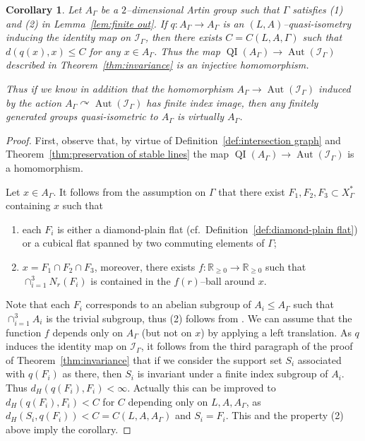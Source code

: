 \documentclass[11pt]{amsart}
\newcommand{\QI}{\operatorname{QI}}
\newcommand{\Aut}{\operatorname{Aut}}
\newcommand {\I}{\mathcal I}
\newtheorem{corollary}[theorem]{Corollary}
\theoremstyle{definition}
\newcommand{\act}{\curvearrowright}
\newcommand{\Xa}{X^{\ast}}
\begin{document}
\begin{corollary}
	\label{cor:injective2}
	Let $A_{\Gamma}$ be a $2$--dimensional Artin group such that $\Gamma$ satisfies (1) and (2) in Lemma~\ref{lem:finite out}.
If $q\colon A_\Gamma\to A_\Gamma$ is an $(L,A)$--quasi-isometry inducing the identity map on $\I_\Gamma$, then there exists $C=C(L,A,\Gamma)$ such that $d(q(x),x)\le C$ for any $x\in A_\Gamma$. Thus the map $\QI(A_\Gamma)\to \Aut(\I_\Gamma)$ described in Theorem~\ref{thm:invariance} is an injective homomorphism.

Thus if we know in addition that the homomorphism $A_\Gamma\to \Aut(\I_\Gamma)$ induced by the action $A_\Gamma\act \Aut(\I_\Gamma)$ has finite index image, then any finitely generated groups quasi-isometric to $A_\Gamma$ is virtually $A_\Gamma$.
\end{corollary}

\begin{proof}
First, observe that, by virtue of Definition~\ref{def:intersection graph} and Theorem~\ref{thm:preservation of stable lines} the map $\QI(A_\Gamma)\to \Aut(\I_\Gamma)$ is a homomorphism.
	
Let $x\in A_\Gamma$. It follows from the assumption on $\Gamma$ that there exist $F_1,F_2,F_3\subset \Xa_\Gamma$ containing $x$ such that
\begin{enumerate}
	\item each $F_i$ is either a diamond-plain flat (cf.\ Definition~\ref{def:diamond-plain flat}) or a cubical flat spanned by two commuting elements of $\Gamma$;
	\item $x=F_1\cap F_2\cap F_3$, moreover, there exists $f\colon \mathbb R_{\ge 0}\to \mathbb R_{\ge 0}$ such that $\cap_{i=1}^3N_r(F_i)$ is contained in the $f(r)$--ball around $x$.
\end{enumerate}
Note that each $F_i$ corresponds to an abelian subgroup of $A_i\le A_\Gamma$ such that $\cap_{i=1}^3A_i$ is the trivial subgroup, thus (2) follows from \cite[Corollary 2.4]{MR2867450}. We can assume that the function $f$ depends only on $A_\Gamma$ (but not on $x$) by applying a left translation. As $q$ induces the identity map on $\I_\Gamma$, it follows from the third paragraph of the proof of Theorem~\ref{thm:invariance} that if we consider the support set $S_i$ associated with $q(F_i)$ as there, then $S_i$ is invariant under a finite index subgroup of $A_i$. Thus $d_H(q(F_i),F_i)<\infty$. Actually this can be improved to $d_H(q(F_i),F_i)<C$ for $C$ depending only on $L,A,A_\Gamma$, as $d_H(S_i,q(F_i))<C=C(L,A,A_\Gamma)$ and $S_i=F_i$. This and the property (2) above imply the corollary.
\end{proof}
\end{document}
